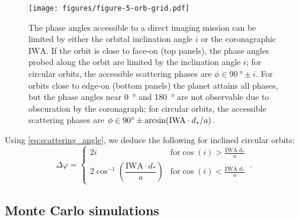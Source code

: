 \documentclass[
    usenatbib,
]{mnras}
\newcommand{\IWA}{\ensuremath{\mathrm{IWA}}}
\begin{document}
\begin{figure}
   \centering
   \texttt{[image: figures/figure-5-orb-grid.pdf]}
   \caption{
        The phase angles accessible to a direct imaging mission 
        can be limited by either the orbital inclination angle $i$ or the coronagraphic \IWA{}.
        If the orbit is close to face-on (top panels), the phase angles probed along the orbit are limited by the inclination angle $i$; for circular orbits, the accessible scattering phases are $\phi \in \qty{90}{\degree} \pm i$. 
        For orbits close to edge-on (bottom panels) the planet attains all 
        phases, but the phase angles near \qty{0}{\degree} and \qty{180}{\degree} are not observable due to obscuration by the coronagraph; for circular orbits, the accessible scattering phases are $\phi \in \qty{90}{\degree} \pm \arcsin({\rm IWA}\cdot d_*/a)$.
    }
    \label{fig:orb-grid}
\end{figure}

Using \cref{eq:scattering_angle}, we deduce the following for inclined 
circular orbits: 
\begin{equation}
\label{eq:Delta_phi_max}
    \Delta \varphi = 
    \begin{cases}
        2 i & \textrm{for} \cos(i) > \frac{\mathrm{IWA}\; d_* }{a} \\ 
        2 \cos^{-1}\left(\dfrac{\mathrm{IWA}\cdot d_* }{a}\right) & \textrm{for} \cos(i) < \frac{\mathrm{IWA}\; d_* }{a}
    \end{cases} \,.
\end{equation}





\subsection{Monte Carlo simulations}
\label{subsec:2.3}
\end{document}
